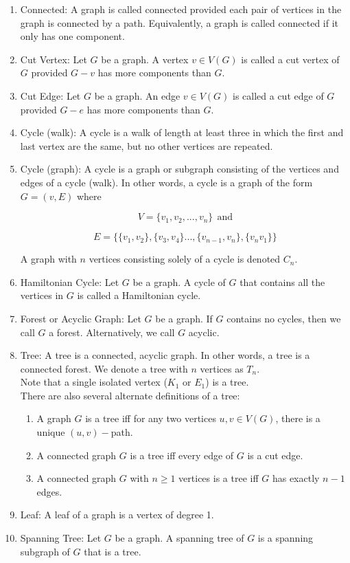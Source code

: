 \documentclass{article}
\begin{document}
\begin{enumerate}
    \item Connected: A graph is called connected provided each pair of vertices in the graph is connected by a path. Equivalently, a graph is called connected if it only has one component. 
    
    \item Cut Vertex: Let $G$ be a graph. A vertex $v\in V(G)$ is called a cut vertex of $G$ provided $G-v$ has more components than $G$.
    
    \item Cut Edge: Let $G$ be a graph. An edge $v\in V(G)$ is called a cut edge of $G$ provided $G-e$ has more components than $G$.
    
    \item Cycle (walk): A cycle is a walk of length at least three in which the first and last vertex are the same, but no other vertices are repeated.
    
    \item Cycle (graph): A cycle is a graph or subgraph consisting of the vertices and edges of a cycle (walk). In other words, a cycle is a graph of the form $G=(v,E)$ where 
    
    \[V=\{v_1,v_2,...,v_n\} \:\: \text{and}\]
    
    \[E=\{\{v_1,v_2\}, \{v_3,v_4\}...,\{v_{n-1},v_n\},\{v_nv_1\}\}\]
    
    A graph with $n$ vertices consisting solely of a cycle is denoted $C_n$.
    
    \item Hamiltonian Cycle: Let $G$ be a graph. A cycle of $G$ that contains all the vertices in $G$ is called a Hamiltonian cycle.
    
    \item Forest or Acyclic Graph: Let $G$ be a graph. If $G$ contains no cycles, then we call $G$ a forest. Alternatively, we call $G$ acyclic.
    
    \item Tree: A tree is a connected, acyclic graph. In other words, a tree is a connected forest. We denote a tree with $n$ vertices as $T_n$.\\
    
    Note that a single isolated vertex ($K_1$ or $E_1$) is a tree.\\
    
    There are also several alternate definitions of a tree:
    
        \begin{enumerate}
            \item A graph $G$ is a tree iff for any two vertices $u,v\in V(G)$, there is a unique $(u,v)-$path. 
            \item A connected graph $G$ is a tree iff every edge of $G$ is a cut edge.
            \item A connected graph $G$ with $n\geq 1$ vertices is a tree iff $G$ has exactly $n-1$ edges.
        \end{enumerate}
        
    \item Leaf: A leaf of a graph is a vertex of degree 1.
    
    \item Spanning Tree: Let $G$ be a graph. A spanning tree of $G$ is a spanning subgraph of $G$ that is a tree. 
    
\end{enumerate}
\end{document}
